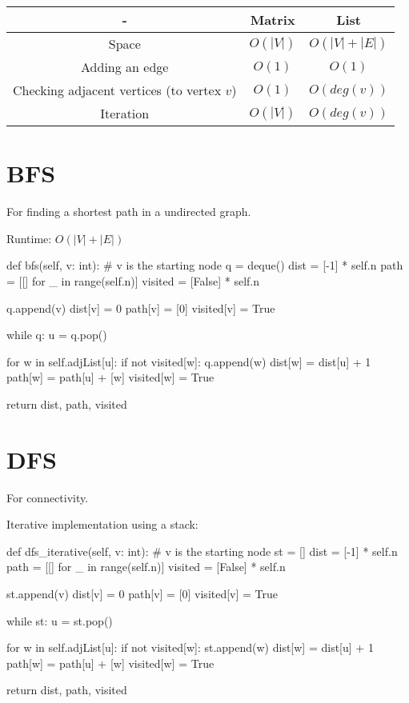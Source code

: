 \begin{center}
  \begin{tabular}{ | c | c | c | }
    \hline
    - & Matrix & List \\
    \hline
    Space & $O(|V|)$ & $O(|V| + |E|)$ \\
    \hline
    Adding an edge & $O(1)$ & $O(1)$ \\
    \hline
    Checking adjacent vertices (to vertex $v$) & $O(1)$ & $O(deg(v))$ \\
    \hline
    Iteration & $O(|V|)$ & $O(deg(v))$ \\
    \hline
  \end{tabular}
\end{center}

\section{BFS}

For finding a shortest path in a undirected graph.

Runtime: $O(|V| + |E|)$

\begin{python}
    def bfs(self, v: int):  # v is the starting node
        q = deque()
        dist = [-1] * self.n
        path = [[] for _ in range(self.n)]
        visited = [False] * self.n

        q.append(v)
        dist[v] = 0
        path[v] = [0]
        visited[v] = True

        while q:
            u = q.pop()

            for w in self.adjList[u]:
                if not visited[w]:
                    q.append(w)
                    dist[w] = dist[u] + 1
                    path[w] = path[u] + [w]
                    visited[w] = True

        return dist, path, visited
\end{python}

\section{DFS}

For connectivity.

\noindent Iterative implementation using a stack:

\begin{python}
    def dfs_iterative(self, v: int):  # v is the starting node
        st = []
        dist = [-1] * self.n
        path = [[] for _ in range(self.n)]
        visited = [False] * self.n

        st.append(v)
        dist[v] = 0
        path[v] = [0]
        visited[v] = True

        while st:
            u = st.pop()

            for w in self.adjList[u]:
                if not visited[w]:
                    st.append(w)
                    dist[w] = dist[u] + 1
                    path[w] = path[u] + [w]
                    visited[w] = True

        return dist, path, visited
\end{python}


